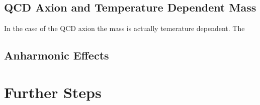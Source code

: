 \documentclass[a4paper]{article}
\begin{document}
\subsection{QCD Axion and Temperature Dependent Mass}
\label{sec:temerature_dependent_mass}
In the case of the QCD axion the mass is actually temerature dependent.
The

\subsection{Anharmonic Effects}
\label{sec:anharmonic_effects}

\section{Further Steps}

{}

\end{document}
